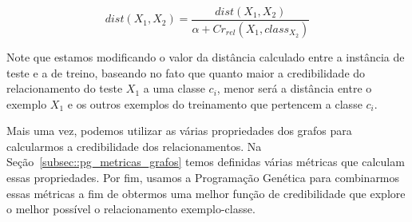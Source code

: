 \begin{equation}\label{eqn::distancia_grafos}
    dist(X_1, X_2) = \frac{ dist(X_1, X_2) } { \alpha + Cr_{rel}(X_1, class_{X_2}) }
\end{equation}

Note que estamos modificando o valor da distância calculado entre a instância de teste e a de treino, baseando no fato que quanto maior a credibilidade do relacionamento do teste $X_1$ a uma classe $c_i$, menor será a distância entre o exemplo $X_1$ e os outros exemplos do treinamento que pertencem a classe $c_i$.

Mais uma vez, podemos utilizar as várias propriedades dos grafos para calcularmos a credibilidade dos relacionamentos. Na Seção~\ref{subsec::pg_metricas_grafos} temos definidas várias métricas que calculam essas propriedades. Por fim, usamos a Programação Genética para combinarmos essas métricas a fim de obtermos uma melhor função de credibilidade que explore o melhor possível o relacionamento exemplo-classe.

